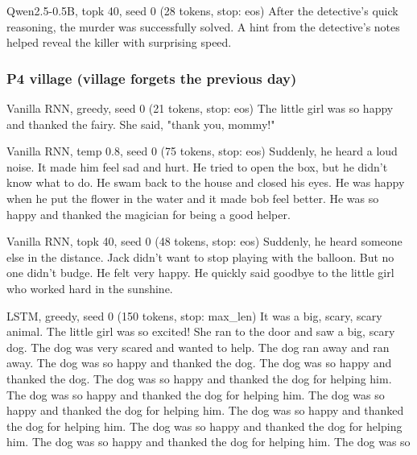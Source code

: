 \begin{modelout}{Qwen2.5-0.5B, topk 40, seed 0 (28 tokens, stop: eos)}
\small After the detective's quick reasoning, the murder was successfully solved. A hint from the detective's notes helped reveal the killer with surprising speed.
\end{modelout}

\subsubsection*{P4 village (village forgets the previous day)}

\begin{modelout}{Vanilla RNN, greedy, seed 0 (21 tokens, stop: eos)}
\small The little girl was so happy and thanked the fairy. She said, "thank you, mommy!"
\end{modelout}

\begin{modelout}{Vanilla RNN, temp 0.8, seed 0 (75 tokens, stop: eos)}
\small Suddenly, he heard a loud noise. It made him feel sad and hurt. He tried to open the box, but he didn't know what to do. He swam back to the house and closed his eyes. He was happy when he put the flower in the water and it made bob feel better. He was so happy and thanked the magician for being a good helper.
\end{modelout}

\begin{modelout}{Vanilla RNN, topk 40, seed 0 (48 tokens, stop: eos)}
\small Suddenly, he heard someone else in the distance. Jack didn't want to stop playing with the balloon. But no one didn't budge. He felt very happy. He quickly said goodbye to the little girl who worked hard in the sunshine.
\end{modelout}

\begin{modelout}{LSTM, greedy, seed 0 (150 tokens, stop: max\_len)}
\small It was a big, scary, scary animal. The little girl was so excited! She ran to the door and saw a big, scary dog. The dog was very scared and wanted to help. The dog ran away and ran away. The dog was so happy and thanked the dog. The dog was so happy and thanked the dog. The dog was so happy and thanked the dog for helping him. The dog was so happy and thanked the dog for helping him. The dog was so happy and thanked the dog for helping him. The dog was so happy and thanked the dog for helping him. The dog was so happy and thanked the dog for helping him. The dog was so happy and thanked the dog for helping him. The dog was so
\end{modelout}

